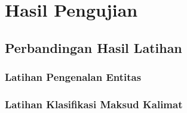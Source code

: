 \chapter{Hasil Pengujian}

\blindtext

\section{Perbandingan Hasil Latihan}
\blindtext

\subsection{Latihan Pengenalan Entitas}
\blindtext

\subsection{Latihan Klasifikasi Maksud Kalimat}
\blindtext